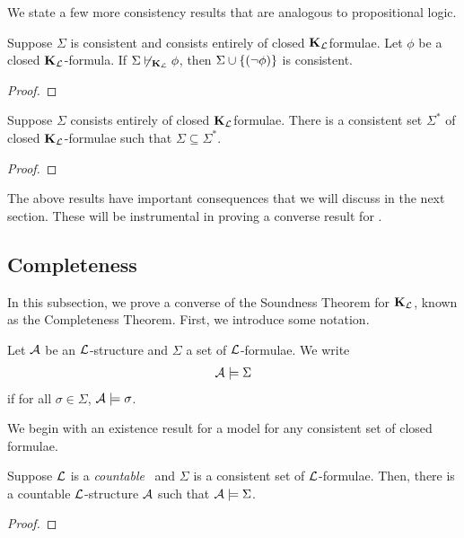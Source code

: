 We state a few more consistency results that are analogous to propositional logic.

\begin{boxproposition}
    Suppose $\Sigma$ is consistent and consists entirely of closed $\mathbf{K}_{\mathcal{L}}$formulae. Let $\phi$ be a closed $\mathbf{K}_{\mathcal{L}}$-formula. If $\Sigma \not\vdash_{\mathbf{K}_{\mathcal{L}}} \phi$, then $\Sigma \cup \left\{ \left( \neg \phi \right) \right\}$ is consistent.
\end{boxproposition}
\begin{proof}
    \sorry %
\end{proof}

\begin{boxproposition}
    Suppose $\Sigma$ consists entirely of closed $\mathbf{K}_{\mathcal{L}}$formulae. There is a consistent set $\Sigma^*$ of closed $\mathbf{K}_{\mathcal{L}}$-formulae such that $\Sigma \subseteq \Sigma^*$.
\end{boxproposition}
\begin{proof}
    \sorry %
\end{proof}

The above results have important consequences that we will discuss in the next section. These will be instrumental in proving a converse result for .


\subsection{Completeness}

In this subsection, we prove a converse of the Soundness Theorem for $\mathbf{K}_{\mathcal{L}}$, known as the Completeness Theorem. First, we introduce some notation.

\begin{boxconvention}
    Let $\mathcal{A}$ be an $\mathcal{L}$-structure and $\Sigma$ a set of $\mathcal{L}$-formulae. We write
    \begin{align*}
        \mathcal{A} \models \Sigma
    \end{align*}
    if for all $\sigma \in \Sigma$, $\mathcal{A} \models \sigma$.
\end{boxconvention}

We begin with an existence result for a model for any consistent set of closed formulae.

\begin{boxtheorem}
    Suppose $\mathcal{L}$ is a \textit{countable} \fola\ and $\Sigma$ is a consistent set of $\mathcal{L}$-formulae. Then, there is a countable $\mathcal{L}$-structure $\mathcal{A}$ such that $\mathcal{A} \models \Sigma$.
\end{boxtheorem}
\begin{proof}
    \sorry %
\end{proof}

